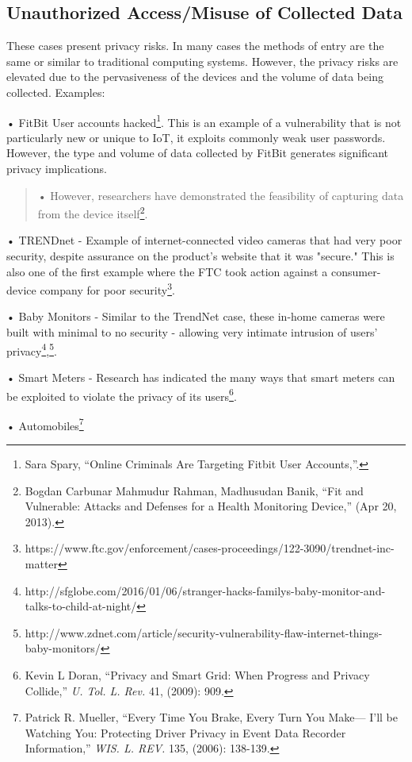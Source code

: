 \subsection{Unauthorized Access/Misuse of Collected Data}

These cases present privacy risks. In many cases the methods of entry
are the same or similar to traditional computing systems. However, the
privacy risks are elevated due to the pervasiveness of the devices and
the volume of data being collected. Examples:

• FitBit User accounts hacked\footnote{Sara Spary, ``Online Criminals
  Are Targeting Fitbit User Accounts,''.}. This is an example of a
vulnerability that is not particularly new or unique to IoT, it exploits
commonly weak user passwords. However, the type and volume of data
collected by FitBit generates significant privacy implications.

\begin{quote}
• However, researchers have demonstrated the feasibility of capturing
data from the device itself\footnote{Bogdan Carbunar Mahmudur Rahman,
  Madhusudan Banik, ``Fit and Vulnerable: Attacks and Defenses for a
  Health Monitoring Device,'' (Apr 20, 2013).}.
\end{quote}

• TRENDnet - Example of internet-connected video cameras that had very
poor security, despite assurance on the product's website that it was
"secure." This is also one of the first example where the FTC took
action against a consumer-device company for poor security\footnote{https://www.ftc.gov/enforcement/cases-proceedings/122-3090/trendnet-inc-matter}.

• Baby Monitors - Similar to the TrendNet case, these in-home cameras
were built with minimal to no security - allowing very intimate
intrusion of users' privacy\footnote{http://sfglobe.com/2016/01/06/stranger-hacks-familys-baby-monitor-and-talks-to-child-at-night/},\footnote{http://www.zdnet.com/article/security-vulnerability-flaw-internet-things-baby-monitors/}.

• Smart Meters - Research has indicated the many ways that smart meters
can be exploited to violate the privacy of its users\footnote{Kevin L
  Doran, ``Privacy and Smart Grid: When Progress and Privacy Collide,''
  \emph{U. Tol. L. Rev.} 41, (2009): 909.}.

• Automobiles\footnote{Patrick R. Mueller, ``Every Time You Brake, Every
  Turn You Make--- I'll be Watching You: Protecting Driver Privacy in
  Event Data Recorder Information,'' \emph{WIS. L. REV.} 135, (2006):
  138-139.}